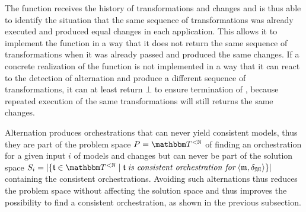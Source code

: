 The  function receives the history of transformations and changes and is thus able to identify the situation that the same sequence of transformations was already executed and produced equal changes in each application.
This allows it to implement the function in a way that it does not return the same sequence of transformations when it was already passed and produced the same changes.
If a concrete realization of the  function is not implemented in a way that it can react to the detection of alternation and produce a different sequence of transformations, it can at least return $\bot$ to ensure termination of , because repeated execution of the same transformations will still returns the same changes. 

Alternation produces orchestrations that can never yield consistent models, thus they are part of the problem space $P = {\transformationset{T}^{< \mathbb{N}}}$ of finding an orchestration for a given input $i$ of models and changes but can never be part of the solution space $S_{i} = \abs{\setted{\tuple{\transformation{t}} \in \transformationset{T}^{< \mathbb{N}} \mid \tuple{\transformation{t}} \mathtext{is consistent orchestration for} \tupled{\modeltuple{m}, \changetuple{\metamodeltuple{M}}}}}$ containing the consistent orchestrations.
Avoiding such alternations thus reduces the problem space without affecting the solution space and thus improves the possibility to find a consistent orchestration, as shown in the previous subsection.



